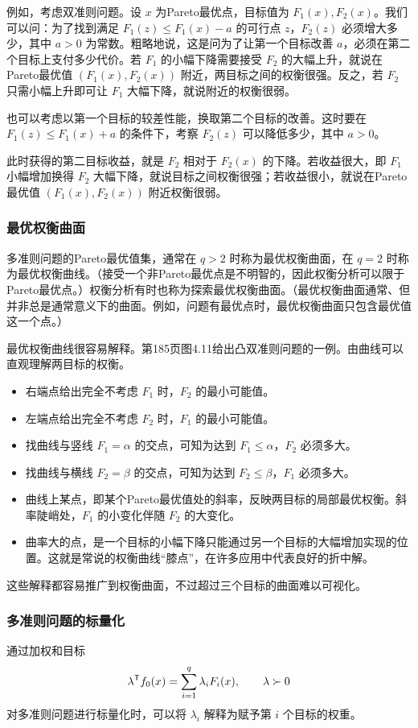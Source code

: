 例如，考虑双准则问题。设 $x$ 为Pareto最优点，目标值为 $F_1(x),F_2(x)$。我们可以问：为了找到满足 $F_1(z)\le F_1(x)-a$ 的可行点 $z$，$F_2(z)$ 必须增大多少，其中 $a>0$ 为常数。粗略地说，这是问为了让第一个目标改善 $a$，必须在第二个目标上支付多少代价。若 $F_1$ 的小幅下降需要接受 $F_2$ 的大幅上升，就说在Pareto最优值 $(F_1(x),F_2(x))$ 附近，两目标之间的权衡很强。反之，若 $F_2$ 只需小幅上升即可让 $F_1$ 大幅下降，就说附近的权衡很弱。

也可以考虑以第一个目标的较差性能，换取第二个目标的改善。这时要在 $F_1(z)\le F_1(x)+a$ 的条件下，考察 $F_2(z)$ 可以降低多少，其中 $a>0$。

此时获得的第二目标收益，就是 $F_2$ 相对于 $F_2(x)$ 的下降。若收益很大，即 $F_1$ 小幅增加换得 $F_2$ 大幅下降，就说目标之间权衡很强；若收益很小，就说在Pareto最优值 $(F_1(x),F_2(x))$ 附近权衡很弱。

\subsubsection*{最优权衡曲面}
多准则问题的Pareto最优值集，通常在 $q>2$ 时称为最优权衡曲面，在 $q=2$ 时称为最优权衡曲线。（接受一个非Pareto最优点是不明智的，因此权衡分析可以限于Pareto最优点。）权衡分析有时也称为探索最优权衡曲面。（最优权衡曲面通常、但并非总是通常意义下的曲面。例如，问题有最优点时，最优权衡曲面只包含最优值这一个点。）

最优权衡曲线很容易解释。第185页图4.11给出凸双准则问题的一例。由曲线可以直观理解两目标的权衡。
\begin{itemize}
\item 右端点给出完全不考虑 $F_1$ 时，$F_2$ 的最小可能值。
\item 左端点给出完全不考虑 $F_2$ 时，$F_1$ 的最小可能值。
\item 找曲线与竖线 $F_1=\alpha$ 的交点，可知为达到 $F_1\le\alpha$，$F_2$ 必须多大。
\item 找曲线与横线 $F_2=\beta$ 的交点，可知为达到 $F_2\le\beta$，$F_1$ 必须多大。
\item 曲线上某点，即某个Pareto最优值处的斜率，反映两目标的局部最优权衡。斜率陡峭处，$F_1$ 的小变化伴随 $F_2$ 的大变化。
\item 曲率大的点，是一个目标的小幅下降只能通过另一个目标的大幅增加实现的位置。这就是常说的权衡曲线“膝点”，在许多应用中代表良好的折中解。
\end{itemize}
这些解释都容易推广到权衡曲面，不过超过三个目标的曲面难以可视化。

\subsubsection*{多准则问题的标量化}
通过加权和目标
\[
\lambda^\mathsf T f_0(x)=\sum_{i=1}^q\lambda_iF_i(x),\qquad\lambda\succ0
\]
对多准则问题进行标量化时，可以将 $\lambda_i$ 解释为赋予第 $i$ 个目标的权重。

